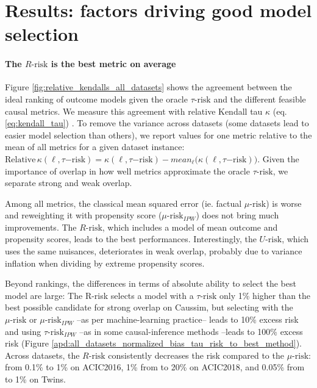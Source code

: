 \documentclass[a4paper,num-refs]{oup-contemporary}%
\begin{document}
\section{Results: factors driving good model selection}\label{empirical_study:results}


\paragraph{The $R\text{-risk}$ is the best metric on average}

Figure \ref{fig:relative_kendalls_all_datasets} shows the agreement between the
ideal ranking of outcome models given the oracle $\tau\text{-risk}$ and the
different feasible causal metrics. We measure this agreement with relative
Kendall tau $\kappa$ (eq. \ref{eq:kendall_tau}) \cite{kendall_new_1938}. To
remove the variance across datasets (some datasets lead to easier model
selection than others), we report values for one metric relative to the mean of
all metrics for a given dataset instance: $\text{Relative} \,
    \kappa(\ell,\tau\mathrm{{-risk}})= \kappa(\ell,\tau\mathrm{{-risk}}) -
    mean_{\ell}\big(\kappa(\ell,\tau\mathrm{{-risk}})\big)$. Given the importance of
overlap in how well metrics approximate the oracle $\tau\text{-risk}$, we
separate strong and weak overlap.

Among all metrics, the classical mean squared error (ie. factual
$\mu\text{-risk}$) is worse and reweighting it with propensity score
($\mu\text{-risk}_{IPW}$) does not bring much improvements. The
$R\text{-risk}$, which includes a model of mean outcome and propensity
scores, leads to the best performances. Interestingly, the
$U\text{-risk}$, which uses the same nuisances, deteriorates in weak overlap, probably due to variance
inflation when dividing by extreme propensity scores.

Beyond rankings, the differences in terms of absolute
ability to select the best model are large: The R-risk selects a model
with a $\tau\text{-risk}$ only 1\% higher
than the best
possible candidate for strong overlap on Caussim, but selecting with
the $\mu\text{-risk}$ or $\mu\text{-risk}_{IPW}$ --as per machine-learning
practice-- leads to 10\% excess risk and using $\tau\text{-risk}_{IPW}$
--as in some causal-inference methods \cite{athey2016recursive,gutierrez_causal_2016}--leads to 100\% excess risk
(Figure
\ref{apd:all_datasets_normalized_bias_tau_risk_to_best_method}). Across
datasets, the $R\text{-risk}$ consistently decreases the
risk compared to the $\mu\text{-risk}$: from
0.1\% to 1\% on ACIC2016,  1\% from to 20\% on ACIC2018,
and 0.05\% from to 1\% on Twins.
\end{document}
